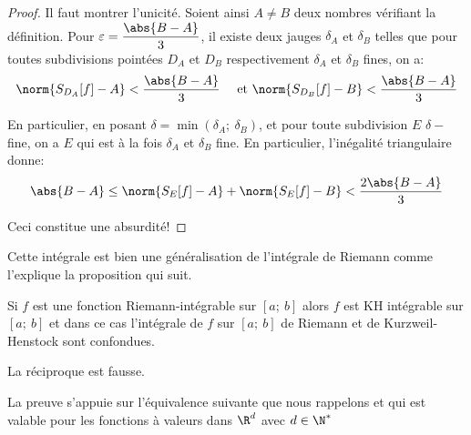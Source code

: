 \begin{proof}
Il faut montrer l'unicité. Soient ainsi $A \neq B$ deux nombres vérifiant la définition. Pour $\varepsilon = \dfrac{\abs{B-A}}{3}$, il existe deux jauges $\delta_A$ et $\delta_B$ telles que pour toutes subdivisions pointées $D_A$ et $D_B$ respectivement $\delta_A$ et $\delta_B$ fines, on a:
\[
\norm{S_{D_A}[f] - A} < \dfrac{\abs{B-A}}{3} \quad \text{ et }\norm{S_{D_B}[f] - B} < \dfrac{\abs{B-A}}{3}
\]

En particulier, en posant $\delta = \min(\delta_A;~\delta_B)$, et pour toute subdivision $E$ $\delta-$fine, on a $E$ qui est à la fois $\delta_A$ et $\delta_B$ fine. En particulier, l'inégalité triangulaire donne:
\[
\abs{B-A} \leq \norm{S_{E}[f] - A} + \norm{S_{E}[f] - B} < \dfrac{2\abs{B-A}}{3}
\]

Ceci constitue une absurdité!
\end{proof}


Cette intégrale est bien une généralisation de l'intégrale de Riemann comme l'explique la proposition qui suit.

\begin{prop}
Si $f$ est une fonction Riemann-intégrable sur $[a;~b]$ alors $f$ est KH intégrable sur $[a;~b]$ et dans ce cas l'intégrale de $f$ sur $[a;~b]$ de Riemann et de Kurzweil-Henstock sont confondues.
\end{prop}

La réciproque est fausse.

\medskip
La preuve s'appuie sur l'équivalence suivante que nous rappelons et qui est valable pour les fonctions à valeurs dans $\R^d$ avec $d \in \N^*$

